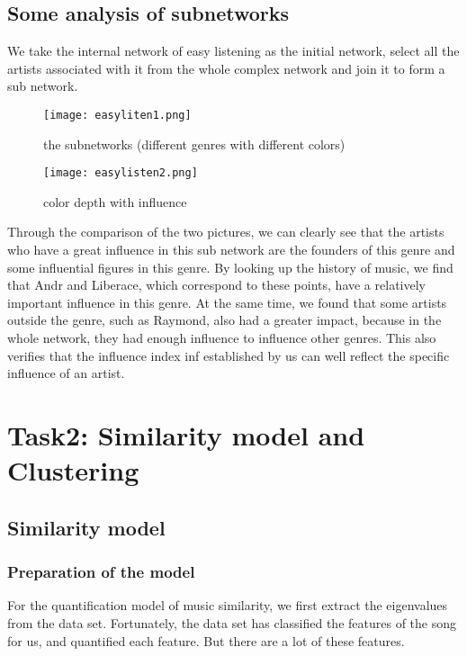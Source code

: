 \documentclass[12pt]{article}  %
\begin{document}
\subsection{Some analysis of subnetworks}

We take the internal network of easy listening as the initial network, select all the artists associated with it from the whole complex network and join it to form a sub network.


\begin{figure}[H]
	\centering
	\begin{minipage}[t]{0.48\textwidth}
		\centering
		\texttt{[image: easyliten1.png]}
		\caption{the subnetworks (different genres with different colors)}
	\end{minipage}
	\begin{minipage}[t]{0.48\textwidth}
		\centering
		\texttt{[image: easylisten2.png]}
		\caption{color depth with influence}
	\end{minipage}
\end{figure}

Through the comparison of the two pictures, we can clearly see that the artists who have a great influence in this sub network are the founders of this genre and some influential figures in this genre. By looking up the history of music, we find that Andr and Liberace, which correspond to these points, have a relatively important influence in this genre. At the same time, we found that some artists outside the genre, such as Raymond, also had a greater impact, because in the whole network, they had enough influence to influence other genres. This also verifies that the influence index inf established by us can well reflect the specific influence of an artist.


\section{Task2: Similarity model and Clustering}
\subsection{Similarity model}
\subsubsection{Preparation of the model}

For the quantification model of music similarity, we first extract the eigenvalues from the data set. Fortunately, the data set has classified the features of the song for us, and quantified each feature. But there are a lot of these features.
\end{document}
